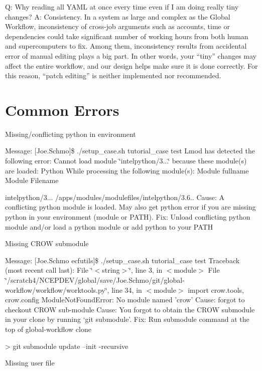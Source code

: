 Q\-: Why reading all Y\-A\-M\-L at once every time even if I am doing really tiny changes? A\-: Consistency. In a system as large and complex as the Global Workflow, inconsistency of cross-\/job arguments such as accounts, time or dependencies could take significant number of working hours from both human and supercomputers to fix. Among them, inconsistency results from accidental error of manual editing plays a big part. In other words, your “tiny” changes may affect the entire workflow, and our design helps make sure it is done correctly. For this reason, “patch editing” is neither implemented nor recommended.

\section*{Common Errors }

Missing/conflicting python in environment

Message\-: \mbox{[}Joe.\-Schmo\mbox{]}\$ ./setup\-\_\-case.sh tutorial\-\_\-case test Lmod has detected the following error\-: Cannot load module \char`\"{}intelpython/3...\char`\"{} because these module(s) are loaded\-: Python While processing the following module(s)\-: Module fullname Module Filename 

 intelpython/3... /apps/modules/modulefiles/intelpython/3.6.. Cause\-: A conflicting python module is loaded. May also get python error if you are missing python in your environment (module or P\-A\-T\-H). Fix\-: Unload conflicting python module and/or load a python module or add python to your P\-A\-T\-H 
 Missing C\-R\-O\-W submodule

Message\-: \mbox{[}Joe.\-Schmo ecfutils\mbox{]}\$ ./setup\-\_\-case.sh tutorial\-\_\-case test Traceback (most recent call last)\-: File \char`\"{}$<$string$>$\char`\"{}, line 3, in $<$module$>$ File \char`\"{}/scratch4/\-N\-C\-E\-P\-D\-E\-V/global/save/\-Joe.\-Schmo/git/global-\/workflow/workflow/worktools.\-py\char`\"{}, line 34, in $<$module$>$ import crow.\-tools, crow.\-config Module\-Not\-Found\-Error\-: No module named 'crow' Cause\-: forgot to checkout C\-R\-O\-W sub-\/module Cause\-: You forgot to obtain the C\-R\-O\-W submodule in your clone by running ‘git submodule’. Fix\-: Run submodule command at the top of global-\/workflow clone \begin{DoxyVerb}> git submodule update --init -recursive
\end{DoxyVerb}
 Missing user file

